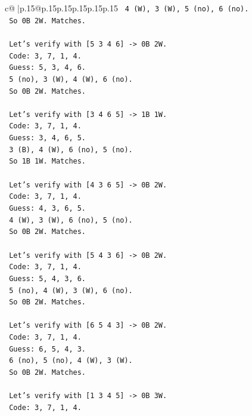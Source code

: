 \documentclass{article}
\begin{document}
{\begin{supertabular}{c@{$\;$}|p{.15\linewidth}@{}p{.15\linewidth}p{.15\linewidth}p{.15\linewidth}p{.15\linewidth}p{.15\linewidth}}
{{{\texttt{   4 (W), 3 (W), 5 (no), 6 (no).} \\
\texttt{   So 0B 2W. Matches.} \\
\\ 
\texttt{   Let's verify with {[}5 3 4 6{]} {-}> 0B 2W.} \\
\texttt{   Code: 3, 7, 1, 4.} \\
\texttt{   Guess: 5, 3, 4, 6.} \\
\texttt{   5 (no), 3 (W), 4 (W), 6 (no).} \\
\texttt{   So 0B 2W. Matches.} \\
\\ 
\texttt{   Let's verify with {[}3 4 6 5{]} {-}> 1B 1W.} \\
\texttt{   Code: 3, 7, 1, 4.} \\
\texttt{   Guess: 3, 4, 6, 5.} \\
\texttt{   3 (B), 4 (W), 6 (no), 5 (no).} \\
\texttt{   So 1B 1W. Matches.} \\
\\ 
\texttt{   Let's verify with {[}4 3 6 5{]} {-}> 0B 2W.} \\
\texttt{   Code: 3, 7, 1, 4.} \\
\texttt{   Guess: 4, 3, 6, 5.} \\
\texttt{   4 (W), 3 (W), 6 (no), 5 (no).} \\
\texttt{   So 0B 2W. Matches.} \\
\\ 
\texttt{   Let's verify with {[}5 4 3 6{]} {-}> 0B 2W.} \\
\texttt{   Code: 3, 7, 1, 4.} \\
\texttt{   Guess: 5, 4, 3, 6.} \\
\texttt{   5 (no), 4 (W), 3 (W), 6 (no).} \\
\texttt{   So 0B 2W. Matches.} \\
\\ 
\texttt{   Let's verify with {[}6 5 4 3{]} {-}> 0B 2W.} \\
\texttt{   Code: 3, 7, 1, 4.} \\
\texttt{   Guess: 6, 5, 4, 3.} \\
\texttt{   6 (no), 5 (no), 4 (W), 3 (W).} \\
\texttt{   So 0B 2W. Matches.} \\
\\ 
\texttt{   Let's verify with {[}1 3 4 5{]} {-}> 0B 3W.} \\
\texttt{   Code: 3, 7, 1, 4.} \\
}}}
\end{supertabular}}
\end{document}

